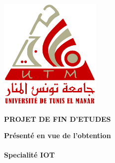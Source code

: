 \begin{minipage}[l]{0.18\columnwidth}
\vspace{6mm}
\hspace{-0.2cm}\includegraphics[width=0.9\columnwidth]{pages/images/FST.png}\\
\end{minipage}
\vskip1.5cm

\begin{center}
{\LARGE{\textbf{\textsc{PROJET DE FIN D'ETUDES}}}}\\
\vskip0.5cm
\large

{\textbf{Présenté en vue de l'obtention }}\\
\vskip2mm
{\textbf{\@diplomaName}}\\
{\textbf{Specialité IOT}}\\
{}
\end{center}

